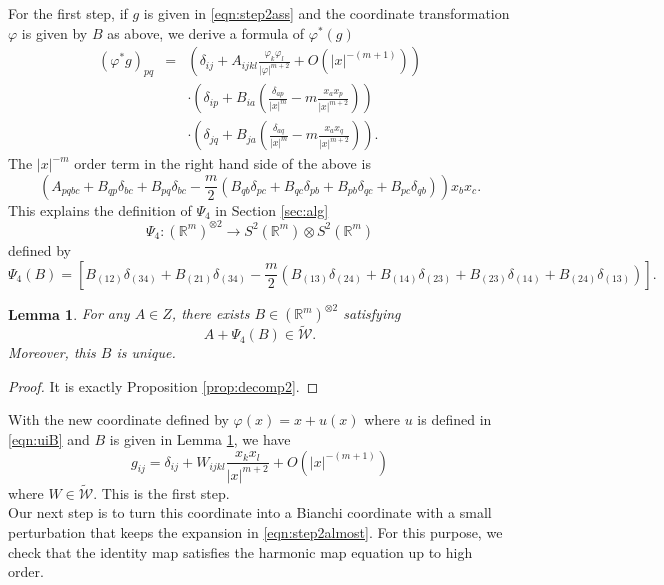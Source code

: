 \documentclass{amsart}
\newtheorem{lem}[thm]{Lemma}
\newcommand{\abs}[1]{\left\vert#1\right\vert}
\newcommand{\Real}{\mathbb R}
\numberwithin{equation}{section}
\begin{document}
For the first step, if $g$ is given in \eqref{eqn:step2ass} and the coordinate transformation $\varphi$ is given by $B$ as above, we derive a formula of $\varphi^*(g)$
\begin{eqnarray*}
	(\varphi^*g)_{pq} &=& \left( \delta_{ij} +A_{ijkl}\frac{\varphi_k \varphi_l}{\abs{\varphi}^{m+2}} + O(\abs{x}^{-(m+1)}) \right) \\
			  && \cdot \left( \delta_{ip} + B_{ia}(\frac{\delta_{ap}}{\abs{x}^m} - m \frac{x_ax_p}{\abs{x}^{m+2}}) \right) \\
			  && \cdot \left( \delta_{jq} + B_{ja}(\frac{\delta_{aq}}{\abs{x}^m} - m \frac{x_ax_q}{\abs{x}^{m+2}}) \right).
\end{eqnarray*}
The $\abs{x}^{-m}$ order term in the right hand side of the above is 
\[
	\left(A_{pqbc}+B_{qp}\delta_{bc}+B_{pq}\delta_{bc}-\frac{m}{2} (B_{qb}\delta_{pc}+B_{qc}\delta_{pb}+B_{pb}\delta_{qc}+B_{pc}\delta_{qb})\right) x_bx_c.
\]
This explains the definition of $\Psi_4$ in Section \ref{sec:alg}
\[
	\Psi_4: (\Real^m)^{\otimes 2} \to S^2(\Real^m)\otimes S^2(\Real^m)
\]
defined by
\[
	\Psi_4(B)= [B_{(12)}\delta_{(34)}+B_{(21)}\delta_{(34)}- \frac{m}{2}(B_{(13)}\delta_{(24)}+B_{(14)}\delta_{(23)}+B_{(23)}\delta_{(14)}+B_{(24)}\delta_{(13)})].
\]
\begin{lem}
	\label{lem:findB}
	For any $A\in Z$, there exists $B\in (\Real^m)^{\otimes 2}$ satisfying
	\[
		A+ \Psi_4(B)\in \widetilde{\mathcal W}.
	\]
	Moreover, this $B$ is unique.
\end{lem}
\begin{proof}
	It is exactly Proposition \ref{prop:decomp2}.
\end{proof}

With the new coordinate defined by $\varphi(x)=x+u(x)$ where $u$ is defined in \eqref{eqn:uiB} and $B$ is given in Lemma \ref{lem:findB}, we have
\begin{equation}
	\label{eqn:step2almost}
	g_{ij}=\delta_{ij}+ W_{ijkl}\frac{x_kx_l}{\abs{x}^{m+2}} + O(\abs{x}^{-(m+1)})
\end{equation}
where $W\in \widetilde{\mathcal W}$. This is the first step.\\

Our next step is to turn this coordinate into a Bianchi coordinate with a small perturbation that keeps the expansion in \eqref{eqn:step2almost}. For this purpose,  we check that the identity map satisfies the harmonic map equation up to high order.
\end{document}
